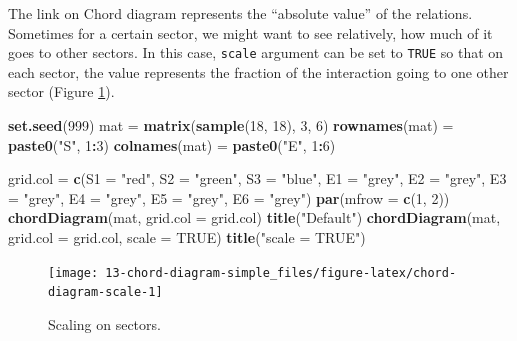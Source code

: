 \documentclass[]{book}
\newenvironment{Shaded}{\begin{snugshade}}{\end{snugshade}}
\newcommand{\KeywordTok}[1]{\textcolor[rgb]{0.13,0.29,0.53}{\textbf{#1}}}
\newcommand{\DataTypeTok}[1]{\textcolor[rgb]{0.13,0.29,0.53}{#1}}
\newcommand{\DecValTok}[1]{\textcolor[rgb]{0.00,0.00,0.81}{#1}}
\newcommand{\StringTok}[1]{\textcolor[rgb]{0.31,0.60,0.02}{#1}}
\newcommand{\OtherTok}[1]{\textcolor[rgb]{0.56,0.35,0.01}{#1}}
\newcommand{\OperatorTok}[1]{\textcolor[rgb]{0.81,0.36,0.00}{\textbf{#1}}}
\newcommand{\NormalTok}[1]{#1}
\begin{document}
The link on Chord diagram represents the ``absolute value'' of the
relations. Sometimes for a certain sector, we might want to see
relatively, how much of it goes to other sectors. In this case,
\texttt{scale} argument can be set to \texttt{TRUE} so that on each
sector, the value represents the fraction of the interaction going to
one other sector (Figure \ref{fig:chord-diagram-scale}).

\begin{Shaded}
\begin{Highlighting}[]
\KeywordTok{set.seed}\NormalTok{(}\DecValTok{999}\NormalTok{)}
\NormalTok{mat =}\StringTok{ }\KeywordTok{matrix}\NormalTok{(}\KeywordTok{sample}\NormalTok{(}\DecValTok{18}\NormalTok{, }\DecValTok{18}\NormalTok{), }\DecValTok{3}\NormalTok{, }\DecValTok{6}\NormalTok{) }
\KeywordTok{rownames}\NormalTok{(mat) =}\StringTok{ }\KeywordTok{paste0}\NormalTok{(}\StringTok{"S"}\NormalTok{, }\DecValTok{1}\OperatorTok{:}\DecValTok{3}\NormalTok{)}
\KeywordTok{colnames}\NormalTok{(mat) =}\StringTok{ }\KeywordTok{paste0}\NormalTok{(}\StringTok{"E"}\NormalTok{, }\DecValTok{1}\OperatorTok{:}\DecValTok{6}\NormalTok{)}

\NormalTok{grid.col =}\StringTok{ }\KeywordTok{c}\NormalTok{(}\DataTypeTok{S1 =} \StringTok{"red"}\NormalTok{, }\DataTypeTok{S2 =} \StringTok{"green"}\NormalTok{, }\DataTypeTok{S3 =} \StringTok{"blue"}\NormalTok{,}
    \DataTypeTok{E1 =} \StringTok{"grey"}\NormalTok{, }\DataTypeTok{E2 =} \StringTok{"grey"}\NormalTok{, }\DataTypeTok{E3 =} \StringTok{"grey"}\NormalTok{, }\DataTypeTok{E4 =} \StringTok{"grey"}\NormalTok{, }\DataTypeTok{E5 =} \StringTok{"grey"}\NormalTok{, }\DataTypeTok{E6 =} \StringTok{"grey"}\NormalTok{)}
\KeywordTok{par}\NormalTok{(}\DataTypeTok{mfrow =} \KeywordTok{c}\NormalTok{(}\DecValTok{1}\NormalTok{, }\DecValTok{2}\NormalTok{))}
\KeywordTok{chordDiagram}\NormalTok{(mat, }\DataTypeTok{grid.col =}\NormalTok{ grid.col)}
\KeywordTok{title}\NormalTok{(}\StringTok{"Default"}\NormalTok{)}
\KeywordTok{chordDiagram}\NormalTok{(mat, }\DataTypeTok{grid.col =}\NormalTok{ grid.col, }\DataTypeTok{scale =} \OtherTok{TRUE}\NormalTok{)}
\KeywordTok{title}\NormalTok{(}\StringTok{"scale = TRUE"}\NormalTok{)}
\end{Highlighting}
\end{Shaded}

\begin{figure}

{\centering \texttt{[image: 13-chord-diagram-simple\_files/figure-latex/chord-diagram-scale-1]} 

}

\caption{Scaling on sectors.}\label{fig:chord-diagram-scale}
\end{figure}
\end{document}
